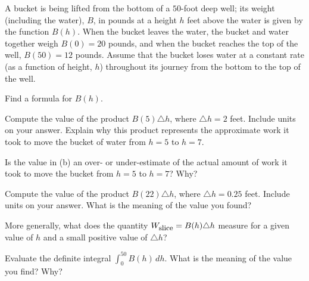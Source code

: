 \begin{pa} \label{PA:6.5}  A bucket is being lifted from the bottom of a $50$-foot deep well; its weight (including the water), $B$, in pounds at a height $h$ feet above the water is given by the function $B(h)$.  When the bucket leaves the water, the bucket and water together weigh $B(0) = 20$ pounds, and when the bucket reaches the top of the well, $B(50) = 12$ pounds.  Assume that the bucket loses water at a constant rate (as a function of height, $h$) throughout its journey from the bottom to the top of the well.

\ba
	\item Find a formula for $B(h)$.
	\item Compute the value of the product $B(5) \triangle h$, where $\triangle h = 2$ feet. Include units on your answer.  Explain why this product represents the approximate work it took to move the bucket of water from $h = 5$ to $h = 7$.
	\item Is the value in (b) an over- or under-estimate of the actual amount of work it took to move the bucket from $h = 5$ to $h = 7$?  Why?
	\item Compute the value of the product $B(22) \triangle h$, where $\triangle h = 0.25$ feet.  Include units on your answer.  What is the meaning of the value you found?
	\item More generally, what does the quantity $W_{\mbox{\small{slice}}} = B(h) \triangle h$ measure for a given value of $h$ and a small positive value of $\triangle h$?
	\item Evaluate the definite integral $\int_0^{50} B(h) \, dh$.  What is the meaning of the value you find?  Why?
\ea
\end{pa} 
\afterpa